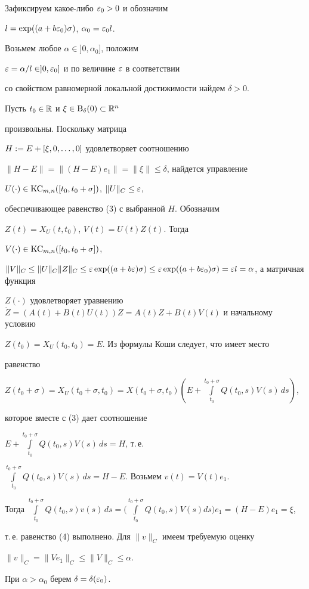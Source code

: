 \begin{pf}


Зафиксируем какое-либо $\varepsilon_0>0$ и обозначим


$l=\exp((a+b\varepsilon_0)\sigma)$, $\alpha_0=\varepsilon_0 l$.


Возьмем любое $\alpha\in]0,\alpha_0]$, положим


$\varepsilon=\alpha/l\in]0,\varepsilon_0]$ и по величине $\varepsilon$ в соответствии


со свойством равномерной локальной достижимости найдем $\delta>0$.


Пусть $t_0\in\Bbb R$ и $\xi\in\mathrm B_{\delta}(0)\subset\Bbb R^n$


произвольны. Поскольку матрица


$H:= E+[\xi,0,\dotsc,0]$ удовлетворяет соотношению


$\|H-E\|=\|(H-E)e_1\|=\|\xi\|\le\delta$, найдется управление


$U(\cdot)\in\mathrm{KC}_{m,n}([t_0,t_0+\sigma])$, $\|U\|_C\le\varepsilon$,


обеспечивающее равенство (3) с выбранной $H$. Обозначим


$Z(t)=X_U(t,t_0)$, $V(t)=U(t)Z(t)$. Тогда


$V(\cdot)\in\mathrm{KC}_{m,n}([t_0,t_0+\sigma])$,


$\|V\|_C\le\|U\|_C\|Z\|_C\le\eps\exp((a+b\eps)\sigma)


\le\eps\exp((a+b\eps_0)\sigma)=\eps l=\alpha$, а матричная функция


$Z(\cdot)$ удовлетворяет уравнению $\Dot


Z=(A(t)+B(t)U(t))Z=A(t)Z+B(t)V(t)$ и начальному условию


$Z(t_0)=X_U(t_0,t_0)=E$. Из формулы Коши следует, что имеет место


равенство


$Z(t_0+\sigma)=X_U(t_0+\sigma,t_0)=


X(t_0+\sigma,t_0)(E+\int\limits_{t_0}^{t_0+\sigma}


Q(t_0,s)V(s)\,ds)$,


которое вместе с (3) дает соотношение


$E+\int\limits_{t_0}^{t_0+\sigma}Q(t_0,s)V(s)\,ds=H$, т.\,е.


$\int\limits_{t_0}^{t_0+\sigma}Q(t_0,s)V(s)\,ds=H-E$. Возьмем $v(t)=V(t)e_1$.


Тогда $\int\limits_{t_0}^{t_0+\sigma}Q(t_0,s)v(s)\,ds=


\Big(\int\limits_{t_0}^{t_0+\sigma}Q(t_0,s)V(s)ds\Big)e_1=(H-E)e_1=\xi$,


т.\,е. равенство (4) выполнено. Для $\|v\|_C$ имеем требуемую оценку


$\|v\|_C=\|Ve_1\|_C\le\|V\|_C\le\alpha$.





При $\alpha>\alpha_0$ берем $\delta=\delta(\varepsilon_0)$.


\end{pf}





